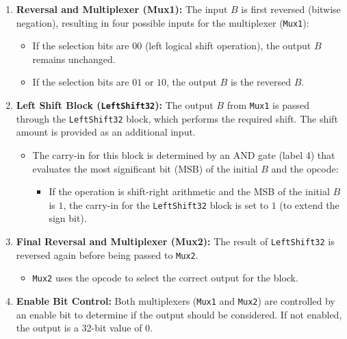 \documentclass{article}
\begin{document}
\begin{enumerate}
    \item \textbf{Reversal and Multiplexer (Mux1):}  
    The input \( B \) is first reversed (bitwise negation), resulting in four possible inputs for the multiplexer (\texttt{Mux1}):
    \begin{itemize}
        \item If the selection bits are \( 00 \) (left logical shift operation), the output \( B \) remains unchanged.
        \item If the selection bits are \( 01 \) or \( 10 \), the output \( B \) is the reversed \( B \).
    \end{itemize}

    \item \textbf{Left Shift Block (\texttt{LeftShift32}):}  
    The output \( B \) from \texttt{Mux1} is passed through the \texttt{LeftShift32} block, which performs the required shift. The shift amount is provided as an additional input.
    \begin{itemize}
        \item The carry-in for this block is determined by an AND gate (label 4) that evaluates the most significant bit (MSB) of the initial \( B \) and the opcode:
        \begin{itemize}
            \item If the operation is shift-right arithmetic and the MSB of the initial \( B \) is \( 1 \), the carry-in for the \texttt{LeftShift32} block is set to \( 1 \) (to extend the sign bit).
        \end{itemize}
    \end{itemize}

    \item \textbf{Final Reversal and Multiplexer (Mux2):}  
    The result of \texttt{LeftShift32} is reversed again before being passed to \texttt{Mux2}.
    \begin{itemize}
        \item \texttt{Mux2} uses the opcode to select the correct output for the block.
    \end{itemize}

    \item \textbf{Enable Bit Control:}  
    Both multiplexers (\texttt{Mux1} and \texttt{Mux2}) are controlled by an enable bit to determine if the output should be considered. If not enabled, the output is a 32-bit value of \( 0 \).
\end{enumerate}
\end{document}
